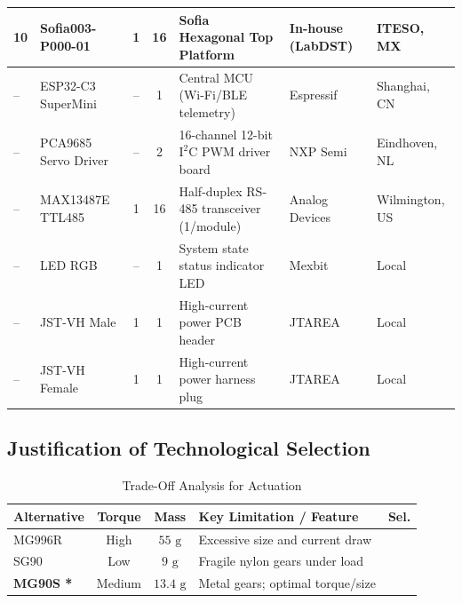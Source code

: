 \documentclass[lettersize,journal]{IEEEtran}
\begin{document}
\begin{table}[!t]
\begin{tabularx}{\columnwidth}{@{}P{0.8cm} P{2.0cm} c c X P{1.1cm} P{0.8cm}@{}}
			10 & Sofia003-P000-01 & 1 & 16 & Sofia Hexagonal Top Platform & In-house (LabDST) & ITESO, MX \\
			\midrule
			-- & ESP32-C3 SuperMini & -- & 1 & Central MCU (Wi-Fi/BLE telemetry) & Espressif & Shanghai, CN \\
			-- & PCA9685 Servo Driver & -- & 2 & 16-channel 12-bit $\text{I}^2\text{C}$ PWM driver board & NXP Semi & Eindhoven, NL \\
			-- & MAX13487E TTL485 & 1 & 16 & Half-duplex RS-485 transceiver (1/module) & Analog Devices & Wilmington, US \\
			-- & LED RGB & -- & 1 & System state status indicator LED & Mexbit & Local \\
			-- & JST-VH Male & 1 & 1 & High-current power PCB header & JTAREA & Local \\
			-- & JST-VH Female & 1 & 1 & High-current power harness plug & JTAREA & Local \\
			
			\bottomrule
		\end{tabularx}
	\end{table}
	
	\subsection{Justification of Technological Selection}
	
	\begin{table}[!t]
		\centering
		\caption{Trade-Off Analysis for Actuation}
		\label{tab:alt_actuation}
		\scriptsize
		\setlength{\tabcolsep}{3pt}
		\renewcommand{\arraystretch}{1.1}
		\begin{tabularx}{\columnwidth}{@{}l c c X c@{}}
			\toprule
			\textbf{Alternative} & \textbf{Torque} & \textbf{Mass} & \textbf{Key Limitation / Feature} & \textbf{Sel.} \\
			\midrule
			MG996R \cite{mg996r} & High & $55\text{ g}$ & Excessive size and current draw & \\
			SG90 \cite{sg90} & Low & $9\text{ g}$ & Fragile nylon gears under load & \\
			\textbf{MG90S \cite{mg90s}*} & Medium & $13.4\text{ g}$ & Metal gears; optimal torque/size & \checkmark \\
			\bottomrule
		\end{tabularx}
	\end{table}
	
\end{document}
